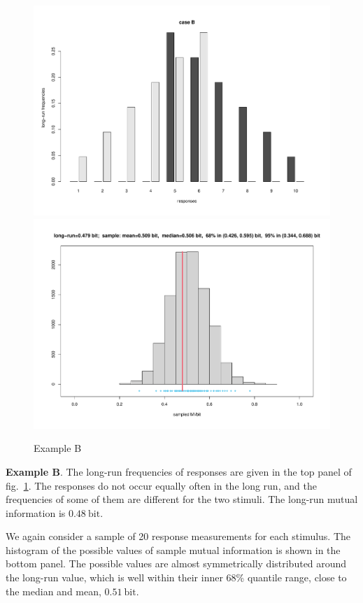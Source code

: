 \documentclass[\ifafour a4paper,12pt,\else a5paper,10pt,\fi%
onecolumn,oneside,article,%
british%
]{memoir}
\theoremstyle{remark}
\theoremstyle{innote}
\renewcommand*{\|}[1][]{\nonscript\,#1\vert\nonscript\;\mathopen{}}
\renewcommand*{\=}{\TextOrMath\texteq\eq}
\newcommand*{\fig}{fig.}%
\newcommand*{\bit}{\mathrm{bit}}
\begin{document}
\begin{figure}[p]%
\centering\includegraphics[width=\linewidth]{scripts/resp_caseB.pdf}\\%
\includegraphics[width=\linewidth]{scripts/histo_caseB.pdf}\\
\caption{Example B}\label{fig:resp_caseB}
\end{figure}%
\textbf{Example B}. The long-run frequencies of responses are given in the top
panel of \fig~\ref{fig:resp_caseB}. The responses do not occur equally
often in the long run, and the frequencies of some of them are different
for the two stimuli. The long-run mutual information is
$0.48\:\bit$.

We again consider a sample of 20 response measurements for each stimulus.
The histogram of the possible values of sample mutual information is shown
in the bottom panel. The possible values are almost symmetrically
distributed around the long-run value, which is well within their inner
68\% quantile range, close to the median and mean, $0.51\:\bit$.
\end{document}
